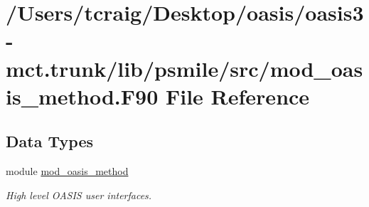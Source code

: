 \hypertarget{mod__oasis__method_8_f90}{\section{/\+Users/tcraig/\+Desktop/oasis/oasis3-\/mct.trunk/lib/psmile/src/mod\+\_\+oasis\+\_\+method.F90 File Reference}
\label{mod__oasis__method_8_f90}
}
\subsection*{Data Types}
\begin{DoxyCompactItemize}
\item 
module \hyperlink{classmod__oasis__method}{mod\+\_\+oasis\+\_\+method}
\begin{DoxyCompactList}\small\item\em High level O\+A\+S\+I\+S user interfaces. \end{DoxyCompactList}\end{DoxyCompactItemize}
